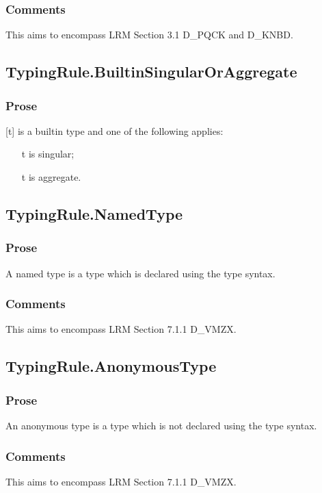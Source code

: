\documentclass{book}
\begin{document}
    \subsubsection{Comments}
    This aims to encompass LRM Section 3.1 D\_PQCK and D\_KNBD.

\subsection{TypingRule.BuiltinSingularOrAggregate}

    \subsubsection{Prose}
    [t] is a builtin type and one of the following applies:
    \begin{itemize}
    \item  [t] is singular;
    \item  [t] is aggregate.
    \end{itemize}

\subsection{TypingRule.NamedType} 

    \subsubsection{Prose}
    A named type is a type which is declared using the type syntax.

    \subsubsection{Comments}
    This aims to encompass LRM Section 7.1.1 D\_VMZX.

\subsection{TypingRule.AnonymousType}

    \subsubsection{Prose} 
    An anonymous type is a type which is not declared using the type syntax. 

    \subsubsection{Comments}
    This aims to encompass LRM Section 7.1.1 D\_VMZX.
\end{document}
